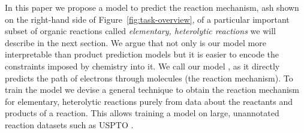 In this paper we propose a model to predict the reaction mechanism, ash shown on the right-hand side of Figure~\ref{fig:task-overview}, of a particular important subset of organic reactions called \emph{elementary, heterolytic reactions} we will describe in the next section.
We argue that not only is our model more interpretable than product prediction models but it is easier to encode the constraints imposed by chemistry into it. We call our model \ourModel, as it directly predicts the path of electrons through molecules (the reaction mechanism). To train the model we devise a general technique to obtain the reaction mechanism for elementary, heterolytic reactions purely from data about the reactants and products of a reaction. This allows training a model on large, unannotated reaction datasets such as USPTO \cite{lowe2012extraction}. %



